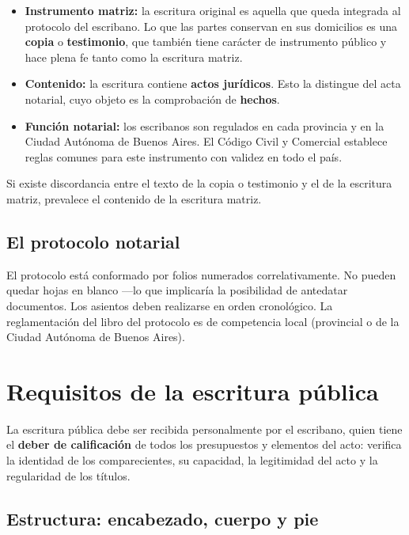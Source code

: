 \documentclass[12pt,oneside]{book}
\begin{document}
\begin{itemize}
    \item \textbf{Instrumento matriz:} la escritura original es aquella que queda integrada al protocolo del escribano. Lo que las partes conservan en sus domicilios es una \textbf{copia} o \textbf{testimonio}, que también tiene carácter de instrumento público y hace plena fe tanto como la escritura matriz.
    \item \textbf{Contenido:} la escritura contiene \textbf{actos jurídicos}. Esto la distingue del acta notarial, cuyo objeto es la comprobación de \textbf{hechos}.
    \item \textbf{Función notarial:} los escribanos son regulados en cada provincia y en la Ciudad Autónoma de Buenos Aires. El Código Civil y Comercial establece reglas comunes para este instrumento con validez en todo el país.
\end{itemize}

\begin{important}
Si existe discordancia entre el texto de la copia o testimonio y el de la escritura matriz, prevalece el contenido de la escritura matriz.
\end{important}

\subsection{El protocolo notarial}

El protocolo está conformado por folios numerados correlativamente. No pueden quedar hojas en blanco —lo que implicaría la posibilidad de antedatar documentos. Los asientos deben realizarse en orden cronológico. La reglamentación del libro del protocolo es de competencia local (provincial o de la Ciudad Autónoma de Buenos Aires).

\section{Requisitos de la escritura pública}

La escritura pública debe ser recibida personalmente por el escribano, quien tiene el \textbf{deber de calificación} de todos los presupuestos y elementos del acto: verifica la identidad de los comparecientes, su capacidad, la legitimidad del acto y la regularidad de los títulos.

\subsection{Estructura: encabezado, cuerpo y pie}
\end{document}
